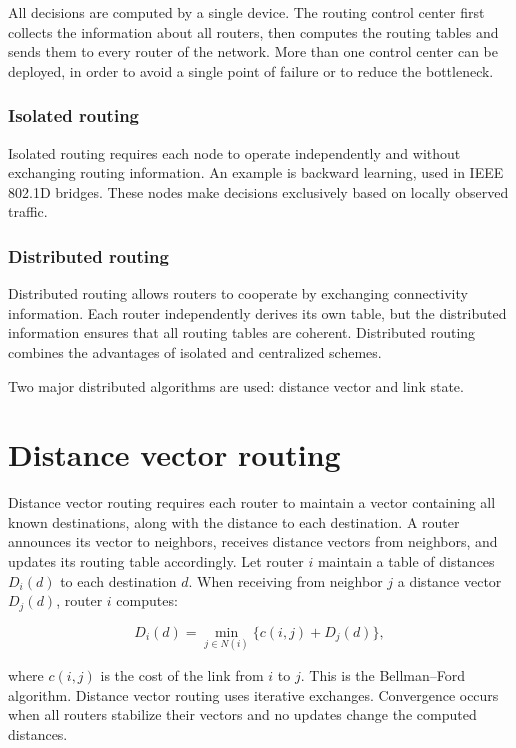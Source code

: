 All decisions are computed by a single device. The routing control center
first collects the information about all routers, then computes the routing
tables and sends them to every router of the network. More than one control
center can be deployed, in order to avoid a single point of failure or to
reduce the bottleneck.

\subsubsection*{Isolated routing}

Isolated routing requires each node to operate independently and without exchanging routing information. An example is backward learning, used in IEEE 802.1D bridges. These nodes make decisions exclusively based on locally observed traffic.

\subsubsection*{Distributed routing}

Distributed routing allows routers to cooperate by exchanging connectivity information. Each router independently derives its own table, but the distributed information ensures that all routing tables are coherent. Distributed routing combines the advantages of isolated and centralized schemes.

Two major distributed algorithms are used: distance vector and link state.

\section{Distance vector routing}

Distance vector routing requires each router to maintain a vector containing all known destinations, along with the distance to each destination. A router announces its vector to neighbors, receives distance vectors from neighbors, and updates its routing table accordingly. Let router $i$ maintain a table of distances $D_i(d)$ to each destination $d$. When receiving from neighbor $j$ a distance vector $D_j(d)$, router $i$ computes:

\[ D_i(d) = \min_{j \in N(i)} \bigl\{ c(i,j) + D_j(d) \bigr\}, \]

\noindent where $c(i,j)$ is the cost of the link from $i$ to $j$. This is the Bellman--Ford algorithm. Distance vector routing uses iterative exchanges. Convergence occurs when all routers stabilize their vectors and no updates change the computed distances.

